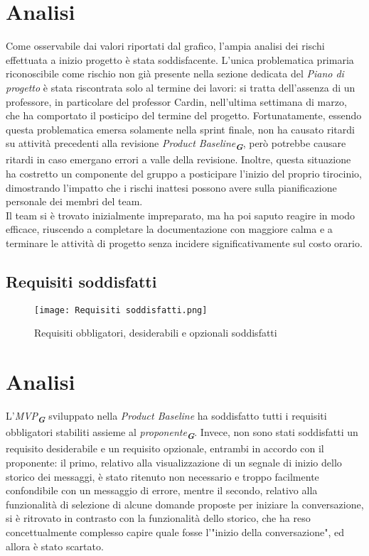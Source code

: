 \section*{Analisi}

Come osservabile dai valori riportati dal grafico, l’ampia analisi dei rischi effettuata a inizio progetto è stata soddisfacente. 
L'unica problematica primaria riconoscibile come rischio non già presente nella sezione dedicata del \emph{Piano di progetto} è stata riscontrata solo al termine dei lavori: 
si tratta dell'assenza di un professore, in particolare del professor Cardin, nell'ultima settimana di marzo, che ha comportato il posticipo del termine del progetto. 
Fortunatamente, essendo questa problematica emersa solamente nella sprint finale, non ha causato ritardi su attività precedenti alla revisione \emph{Product Baseline}\textsubscript{\textbf{\textit{G}}}, 
però potrebbe causare ritardi in caso emergano errori a valle della revisione.
Inoltre, questa situazione ha costretto un componente del gruppo a posticipare l'inizio del proprio tirocinio, dimostrando l'impatto che i rischi inattesi possono avere sulla pianificazione personale dei membri del team.\\
Il team si è trovato inizialmente impreparato, ma ha poi saputo reagire in modo efficace, 
riuscendo a completare la documentazione con maggiore calma e a terminare le attività di progetto 
senza incidere significativamente sul costo orario.



\newpage

\subsection{Requisiti soddisfatti}
\label{subsec:Requisiti soddisfatti}

\begin{figure}[h] 
    \centering
    \texttt{[image: Requisiti soddisfatti.png]}
    \caption{Requisiti obbligatori, desiderabili e opzionali soddisfatti} 
    \label{fig: Requisiti soddisfatti}
\end{figure}

\section*{Analisi}
L'\emph{MVP}\textsubscript{\textbf{\textit{G}}} sviluppato nella \emph{Product Baseline} ha soddisfatto tutti i requisiti obbligatori stabiliti assieme al \emph{proponente}\textsubscript{\textbf{\textit{G}}}. Invece, non sono stati soddisfatti un requisito desiderabile e un requisito opzionale, entrambi in accordo con il proponente: il primo, relativo alla visualizzazione di un segnale di inizio dello storico dei messaggi, è stato ritenuto non necessario e troppo facilmente confondibile con un messaggio di errore, mentre il secondo, relativo alla funzionalità di selezione di alcune domande proposte per iniziare la conversazione, si è ritrovato in contrasto con la funzionalità dello storico, che ha reso concettualmente complesso capire quale fosse l'"inizio della conversazione", ed allora è stato scartato.

